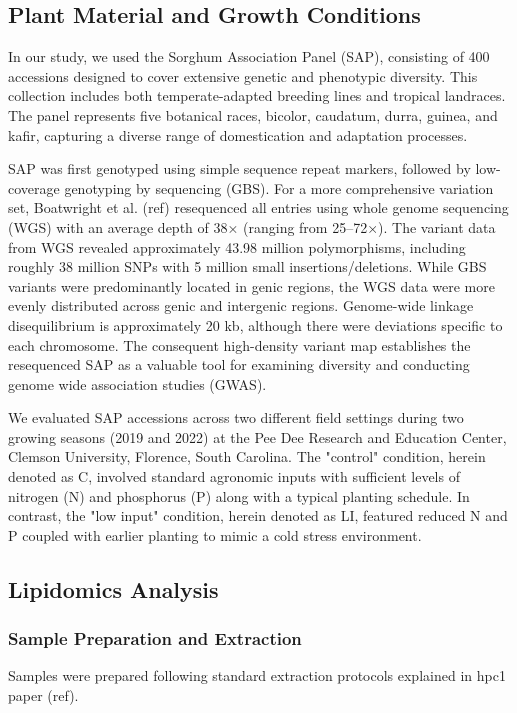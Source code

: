 \documentclass[10pt,letterpaper]{article}
\begin{document}
\subsection*{Plant Material and Growth Conditions}
In our study, we used the Sorghum Association Panel (SAP), consisting of 400 accessions designed to cover extensive genetic and phenotypic diversity. This collection includes both temperate-adapted breeding lines and tropical landraces. The panel represents five botanical races, bicolor, caudatum, durra, guinea, and kafir, capturing a diverse range of domestication and adaptation processes.

SAP was first genotyped using simple sequence repeat markers, followed by low-coverage genotyping by sequencing (GBS). For a more comprehensive variation set, Boatwright et al. (ref) resequenced all entries using whole genome sequencing (WGS) with an average depth of 38× (ranging from 25–72×). The variant data from WGS revealed approximately 43.98 million polymorphisms, including roughly 38 million SNPs with 5 million small insertions/deletions. While GBS variants were predominantly located in genic regions, the WGS data were more evenly distributed across genic and intergenic regions. Genome-wide linkage disequilibrium is approximately 20 kb, although there were deviations specific to each chromosome. The consequent high-density variant map establishes the resequenced SAP as a valuable tool for examining diversity and conducting genome wide association studies (GWAS).

We evaluated SAP accessions across two different field settings during two growing seasons (2019 and 2022) at the Pee Dee Research and Education Center, Clemson University, Florence, South Carolina. The "control" condition, herein denoted as C, involved standard agronomic inputs with sufficient levels of nitrogen (N) and phosphorus (P) along with a typical planting schedule. In contrast, the "low input" condition, herein denoted as LI,  featured reduced N and P coupled with earlier planting to mimic a cold stress environment.

\subsection*{Lipidomics Analysis}

\subsubsection*{Sample Preparation and Extraction}
Samples were prepared following standard extraction protocols explained in hpc1 paper (ref).
\end{document}
